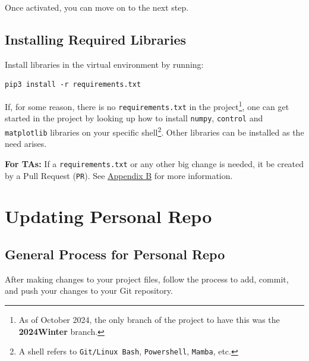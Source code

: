\documentclass{article}
\begin{document}
Once activated, you can move on to the next step.

\subsection{Installing Required Libraries}

Install libraries in the virtual environment by running:

\begin{verbatim}
pip3 install -r requirements.txt
\end{verbatim}
If, for some reason, there is no \texttt{requirements.txt} in the project\footnote{As of October 2024, the only branch of the project to have this was the \textbf{2024Winter} branch. 
}, one can get started in the project by looking up how to install \texttt{numpy}, \texttt{control} and \texttt{matplotlib} libraries on your specific shell\footnote{A shell refers to \texttt{Git/Linux Bash}, \texttt{Powershell}, \texttt{Mamba}, etc.}. Other libraries can be installed as the need arises.

\textbf{For TAs:} If a \texttt{requirements.txt} or any other big change is needed, it be created by a Pull Request (\texttt{PR}). See \hyperref[appendix-b]{Appendix B} for more information.

\section{Updating Personal Repo}

\subsection{General Process for Personal Repo}
After making changes to your project files, follow the process to add, commit, and push your changes to your Git repository.
\end{document}
